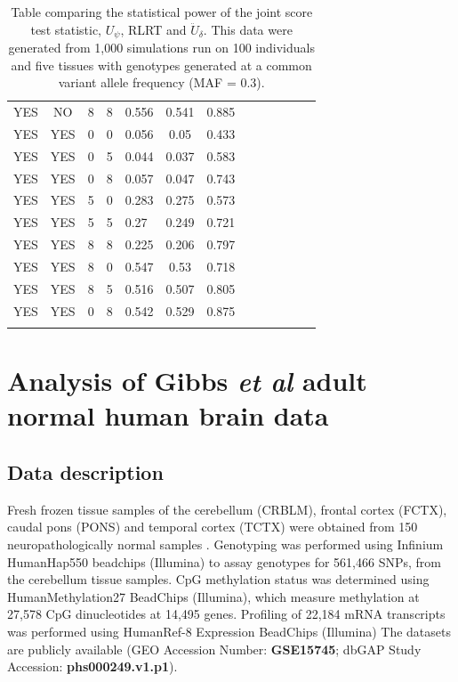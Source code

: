\documentclass[hidelinks]{article}
\begin{document}
\begin{longtable}{lclclclclclc|c|}
YES & NO & 8 & 8 & 0.556 & 0.541 & 0.885 \\ \hdashline
YES & YES & 0 & 0 & 0.056 & 0.05 & 0.433 \\
YES & YES & 0 & 5 & 0.044 & 0.037 & 0.583 \\
YES & YES & 0 & 8 & 0.057 & 0.047 & 0.743 \\
YES & YES & 5 & 0 & 0.283 & 0.275 & 0.573 \\
YES & YES & 5 & 5 & 0.27 & 0.249 & 0.721 \\
YES & YES & 8 & 8 & 0.225 & 0.206 & 0.797 \\
YES & YES & 8 & 0 & 0.547 & 0.53 & 0.718 \\
YES & YES & 8 & 5 & 0.516 & 0.507 & 0.805 \\
YES & YES & 0 & 8 & 0.542 & 0.529 & 0.875 \\
\hline\hline
\caption{Table comparing the statistical power of the joint score test statistic, $U_\psi$, RLRT and $\ddot{U}_{\delta}$. This data were generated from 1,000 simulations run on 100 individuals and five tissues with genotypes generated at a common variant allele frequency (MAF = 0.3). }
\end{longtable}

\section{Analysis of Gibbs \emph{et al} adult normal human brain data}

\subsection{Data description}
Fresh frozen tissue samples of the cerebellum (CRBLM), frontal cortex (FCTX), caudal pons (PONS) and temporal cortex (TCTX) were obtained from 150 neuropathologically normal samples \cite{gibbs}. Genotyping was performed using Infinium HumanHap550 beadchips (Illumina) to assay genotypes for 561,466 SNPs, from the cerebellum tissue samples. CpG methylation status was determined using HumanMethylation27 BeadChips (Illumina), which measure methylation at 27,578 CpG dinucleotides at 14,495 genes. Profiling of 22,184 mRNA transcripts was performed using HumanRef-8 Expression BeadChips (Illumina) The datasets are publicly available (GEO Accession Number: \textbf{GSE15745}; dbGAP Study Accession: \textbf{phs000249.v1.p1}). 
\end{document}
